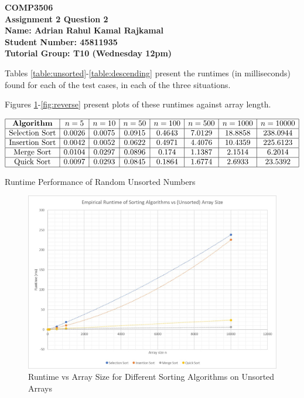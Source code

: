 \documentclass[12pt]{article}
\begin{document}
\begin{center}
\textbf{COMP3506 \\ Assignment 2 Question 2 \\ Name: Adrian Rahul Kamal Rajkamal \\ Student Number: 45811935 \\ Tutorial Group: T10 (Wednesday 12pm)}
\end{center}

\vskip 0.2cm

Tables \ref{table:unsorted}-\ref{table:descending} present the runtimes (in milliseconds) found for each of the test cases, in each of the three situations.

Figures \ref{fig:unsorted}-\ref{fig:reverse} present plots of these runtimes against array length.

\begin{center}
\begin{table}[H]
$$\begin{array}{|c|c|c|c|c|c|c|c|}\hline
\textbf{Algorithm} & n=5 & n=10 & n=50 & n=100 & n=500 & n=1000 & n=10000 \\ \hline
\text{Selection Sort}& 0.0026 & 0.0075 & 0.0915 & 0.4643 & 7.0129 & 18.8858 & 238.0944 \\ \hline
\text{Insertion Sort}& 0.0042 & 0.0052 & 0.0622 & 0.4971 & 4.4076 & 10.4359 & 225.6123\\ \hline
\text{Merge Sort} & 0.0104 & 0.0297 & 0.0896 & 0.174 & 1.1387 & 2.1514 & 6.2014 \\ \hline
\text{Quick Sort}& 0.0097 & 0.0293 & 0.0845 & 0.1864 & 1.6774 & 2.6933 & 23.5392 \\ \hline
\end{array}$$
\caption{Runtime Performance of Random Unsorted Numbers}
\label{table:unsorted}
\end{table}

\begin{center}
\begin{figure}[H]
\hfill\includegraphics[scale=0.8]{unsorted.jpg}
\hspace*{\fill}
\caption{Runtime vs Array Size for Different Sorting Algorithms on Unsorted Arrays}
\label{fig:unsorted}
\end{figure}
\end{center}


\end{center}
\end{document}
